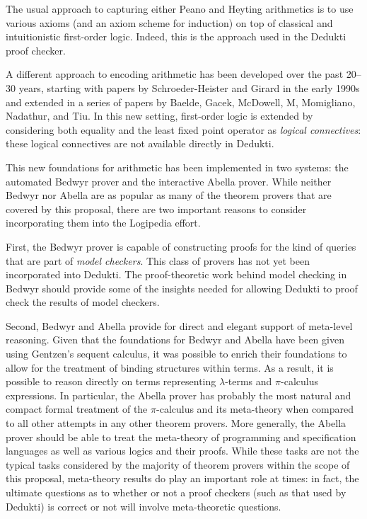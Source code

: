 The usual approach to capturing either Peano and Heyting arithmetics
is to use various axioms (and an axiom scheme for induction) on top of
classical and intuitionistic first-order logic.  Indeed, this is the
approach used in the Dedukti proof checker.


A different approach to encoding arithmetic has been developed over
the past 20--30 years, starting with papers by Schroeder-Heister and
Girard in the early 1990s and extended in a series of papers by
Baelde, Gacek, McDowell, M, Momigliano, Nadathur, and Tiu.  In this
new setting, first-order logic is extended by considering both
equality and the least fixed point operator as \emph{logical
  connectives}: these logical connectives are not available directly
in Dedukti.

This new foundations for arithmetic has been implemented in two
systems: the automated Bedwyr prover and the interactive Abella
prover.  While neither Bedwyr nor Abella are as popular as many of the
theorem provers that are covered by this proposal, there are two
important reasons to consider incorporating them into the Logipedia
effort.

First, the Bedwyr prover is capable of constructing proofs for the
kind of queries that are part of \emph{model checkers}.  This class of
provers has not yet been incorporated into Dedukti.  The
proof-theoretic work behind model checking in Bedwyr should provide
some of the insights needed for allowing Dedukti to proof check the
results of model checkers.

Second, Bedwyr and Abella provide for direct and elegant support of
meta-level reasoning.  Given that the foundations for Bedwyr and
Abella have been given using Gentzen's sequent calculus, it was
possible to enrich their foundations to allow for the treatment of
binding structures within terms.  As a result, it is possible to
reason directly on terms representing $\lambda$-terms and
$\pi$-calculus expressions.  In particular, the Abella prover has
probably the most natural and compact formal treatment of the
$\pi$-calculus and its meta-theory when compared to all other attempts
in any other theorem provers.  More generally, the Abella prover
should be able to treat the meta-theory of programming and
specification languages as well as various logics and their
proofs. While these tasks are not the typical tasks considered by the
majority of theorem provers within the scope of this proposal,
meta-theory results do play an important role at times: in fact, the
ultimate questions as to whether or not a proof checkers (such as that
used by Dedukti) is correct or not will involve meta-theoretic
questions.

